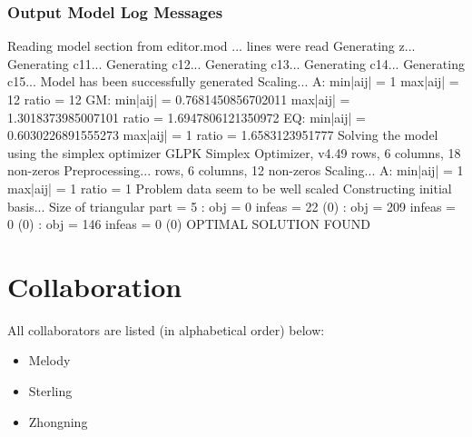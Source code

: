\documentclass[14pt]{extarticle}
\begin{document}
\subsubsection*{Output Model Log Messages}
Reading model section from editor.mod ...
 lines were read
\newline Generating z...
\newline Generating c11...
\newline Generating c12...
\newline Generating c13...
\newline Generating c14...
\newline Generating c15...
\newline Model has been successfully generated
\newline Scaling...
\newline  A: min|aij| = 1  max|aij| = 12  ratio = 12
\newline GM: min|aij| = 0.7681450856702011  max|aij| = 1.3018373985007101  ratio = 1.6947806121350972
\newline EQ: min|aij| = 0.6030226891555273  max|aij| = 1  ratio = 1.6583123951777
\newline Solving the model using the simplex optimizer
\newline GLPK Simplex Optimizer, v4.49
 rows, 6 columns, 18 non-zeros
\newline Preprocessing...
 rows, 6 columns, 12 non-zeros
\newline Scaling...
\newline  A: min|aij| = 1  max|aij| = 1  ratio = 1
\newline Problem data seem to be well scaled
\newline Constructing initial basis...
\newline Size of triangular part = 5
: obj = 0  infeas = 22 (0)
: obj = 209  infeas = 0 (0)
: obj = 146  infeas = 0 (0)
\newline OPTIMAL SOLUTION FOUND

\section*{Collaboration}
All collaborators are listed (in alphabetical order) below:
\begin{itemize}
    \item Melody
    \item Sterling
    \item Zhongning
\end{itemize}
\end{document}
